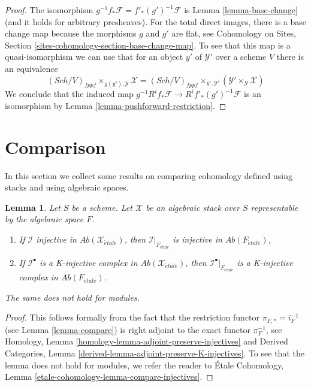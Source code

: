 \documentclass{stacks-project}
\theoremstyle{plain}
\newtheorem{lemma}[subsection]{Lemma}
\theoremstyle{definition}
\theoremstyle{remark}
\numberwithin{equation}{subsection}
\def\Sch{\mathit{Sch}}
\def\etale{{\acute{e}tale}}
\begin{document}
\begin{proof}
The isomorphism $g^{-1}f_*\mathcal{F} = f'_*(g')^{-1}\mathcal{F}$ is
Lemma \ref{lemma-base-change} (and it holds for arbitrary presheaves).
For the total direct images, there is a base change map because the
morphisms $g$ and $g'$ are flat, see
Cohomology on Sites, Section \ref{sites-cohomology-section-base-change-map}.
To see that this map is a quasi-isomorphism we can use that for
an object $y'$ of $\mathcal{Y}'$ over a scheme $V$ there is an equivalence
$$
(\Sch/V)_{fppf} \times_{g(y'), \mathcal{Y}} \mathcal{X}
=
(\Sch/V)_{fppf} \times_{y', \mathcal{Y}'}
(\mathcal{Y}' \times_\mathcal{Y} \mathcal{X})
$$
We conclude that the induced map
$g^{-1}R^if_*\mathcal{F} \to R^if'_*(g')^{-1}\mathcal{F}$
is an isomorphism by
Lemma \ref{lemma-pushforward-restriction}.
\end{proof}












\section{Comparison}
\label{section-compare}

\noindent
In this section we collect some results on comparing cohomology defined
using stacks and using algebraic spaces.

\begin{lemma}
\label{lemma-compare-injectives}
Let $S$ be a scheme. Let $\mathcal{X}$ be an algebraic stack over $S$
representable by the algebraic space $F$.
\begin{enumerate}
\item If $\mathcal{I}$ injective in $\textit{Ab}(\mathcal{X}_\etale)$, then
$\mathcal{I}|_{F_\etale}$ is injective in $\textit{Ab}(F_\etale)$,
\item If $\mathcal{I}^\bullet$ is a K-injective complex in
$\textit{Ab}(\mathcal{X}_\etale)$, then $\mathcal{I}^\bullet|_{F_\etale}$
is a K-injective complex in $\textit{Ab}(F_\etale)$.
\end{enumerate}
The same does not hold for modules.
\end{lemma}

\begin{proof}
This follows formally from the fact that the restriction functor
$\pi_{F, *} = i_F^{-1}$ (see Lemma \ref{lemma-compare})
is right adjoint to the exact functor $\pi_F^{-1}$, see
Homology, Lemma \ref{homology-lemma-adjoint-preserve-injectives} and
Derived Categories, Lemma \ref{derived-lemma-adjoint-preserve-K-injectives}.
To see that the lemma does not hold for modules, we refer the
reader to \'Etale Cohomology, Lemma
\ref{etale-cohomology-lemma-compare-injectives}.
\end{proof}
\end{document}
